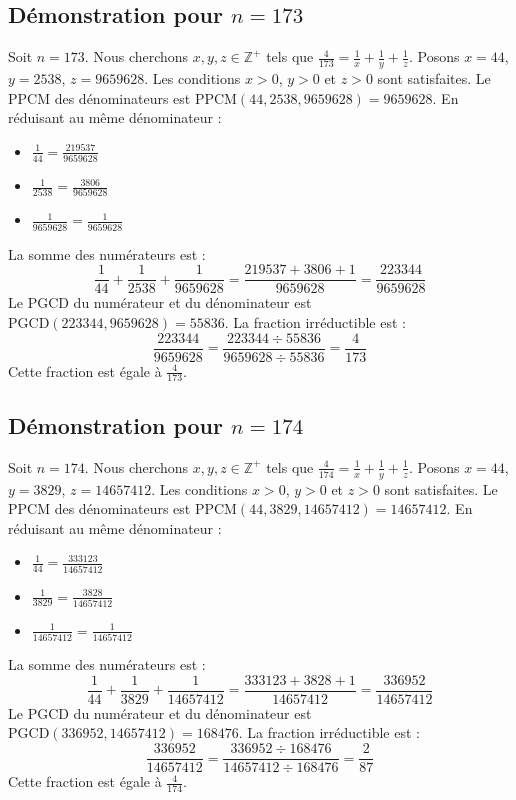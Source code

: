 \documentclass[11pt,a4paper]{article}
\begin{document}
\subsection{Démonstration pour $n = 173$}
Soit $n = 173$. Nous cherchons $x, y, z \in \mathbb{Z}^{+}$ tels que $\frac{4}{173} = \frac{1}{x} + \frac{1}{y} + \frac{1}{z}$.
Posons $x = 44$, $y = 2538$, $z = 9659628$.
Les conditions $x > 0$, $y > 0$ et $z > 0$ sont satisfaites.
Le PPCM des dénominateurs est $\text{PPCM}(44, 2538, 9659628) = 9659628$.
En réduisant au même dénominateur :
\begin{itemize}
    \item $\frac{1}{44} = \frac{219537}{9659628}$
    \item $\frac{1}{2538} = \frac{3806}{9659628}$
    \item $\frac{1}{9659628} = \frac{1}{9659628}$
\end{itemize}
La somme des numérateurs est :
$$ \frac{1}{44} + \frac{1}{2538} + \frac{1}{9659628} = \frac{219537 + 3806 + 1}{9659628} = \frac{223344}{9659628} $$
Le PGCD du numérateur et du dénominateur est $\text{PGCD}(223344, 9659628) = 55836$.
La fraction irréductible est :
$$ \frac{223344}{9659628} = \frac{223344 \div 55836}{9659628 \div 55836} = \frac{4}{173} $$
Cette fraction est égale à $\frac{4}{173}$.

\subsection{Démonstration pour $n = 174$}
Soit $n = 174$. Nous cherchons $x, y, z \in \mathbb{Z}^{+}$ tels que $\frac{4}{174} = \frac{1}{x} + \frac{1}{y} + \frac{1}{z}$.
Posons $x = 44$, $y = 3829$, $z = 14657412$.
Les conditions $x > 0$, $y > 0$ et $z > 0$ sont satisfaites.
Le PPCM des dénominateurs est $\text{PPCM}(44, 3829, 14657412) = 14657412$.
En réduisant au même dénominateur :
\begin{itemize}
    \item $\frac{1}{44} = \frac{333123}{14657412}$
    \item $\frac{1}{3829} = \frac{3828}{14657412}$
    \item $\frac{1}{14657412} = \frac{1}{14657412}$
\end{itemize}
La somme des numérateurs est :
$$ \frac{1}{44} + \frac{1}{3829} + \frac{1}{14657412} = \frac{333123 + 3828 + 1}{14657412} = \frac{336952}{14657412} $$
Le PGCD du numérateur et du dénominateur est $\text{PGCD}(336952, 14657412) = 168476$.
La fraction irréductible est :
$$ \frac{336952}{14657412} = \frac{336952 \div 168476}{14657412 \div 168476} = \frac{2}{87} $$
Cette fraction est égale à $\frac{4}{174}$.
\end{document}
